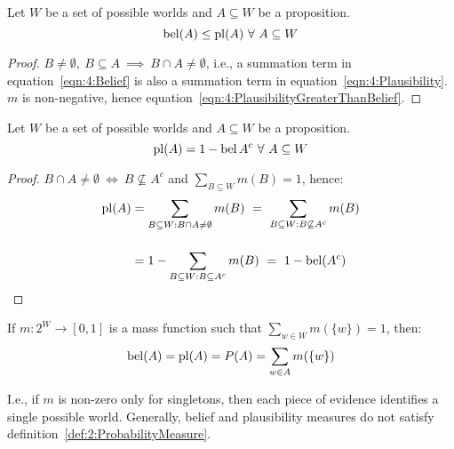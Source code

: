 \begin{thm}
  Let $W$ be a set of possible worlds and $A \subseteq W$ be a proposition.
  \begin{equation}
    \label{eqn:4:PlausibilityGreaterThanBelief}
    \operatorname*{bel}(A) \leq \operatorname*{pl}(A) \ \forall\ A \subseteq W
  \end{equation}
  \begin{proof}
    $B \neq \emptyset,\ B \subseteq A \ \implies \ B \cap A \neq \emptyset$,
    i.e., a summation term in equation~\ref{eqn:4:Belief} is also a summation
    term in equation~\ref{eqn:4:Plausibility}.
    $m$ is non-negative, hence equation~\ref{eqn:4:PlausibilityGreaterThanBelief}.
  \end{proof}
\end{thm}

\begin{thm}
  \label{thm:4:DualRelationship}
  Let $W$ be a set of possible worlds and $A \subseteq W$ be a proposition.
  \begin{equation}
    \label{eqn:4:DualRelationship}
    \operatorname*{pl}(A) = 1 - \operatorname*{bel}{A^{c}} \ \forall\ A \subseteq W
  \end{equation}
  \begin{proof}
    $B \cap A \neq \emptyset \ \iff\  B \not\subseteq A^{c}$ and
    $\sum_{B \subseteq W} m(B) = 1$, hence:
    \begin{align*}
      \operatorname*{pl}(A)
       & = \sum_{B \subseteq W : B \cap A \neq \emptyset} m(B)
      \ =\ \sum_{B \subseteq W : B \not\subseteq A^{c}} m(B)   \\[3ex]
       & = 1 - \sum_{B \subseteq W : B \subseteq A^{c}} m(B)
      \ =\ 1 - \operatorname*{bel}(A^{c})
    \end{align*}
  \end{proof}
\end{thm}

\begin{thm}
  If $m : 2^W \to [0, 1]$ is a mass function such that
  $\sum_{w \in W} m(\{w\}) = 1$, then:
  \begin{equation}
    \operatorname*{bel}(A) = \operatorname*{pl}(A) = P(A) = \sum_{w \in A} m(\{w\})
  \end{equation}
\end{thm}

I.e., if $m$ is non-zero only for singletons, then each piece of evidence
identifies a single possible world.
Generally, belief and plausibility measures do not satisfy
definition~\ref{def:2:ProbabilityMeasure}.

